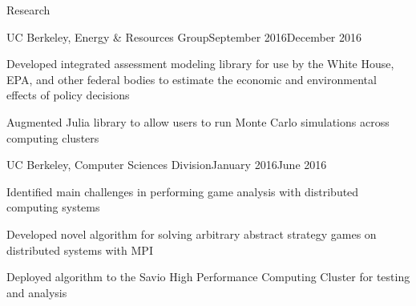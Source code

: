 \documentclass{resume} %
\begin{document}
\begin{rSection}{Research}
\begin{rSubsection}{UC Berkeley, Energy \& Resources Group}{September 2016\textminus December 2016}{}{}
\item[] Developed integrated assessment modeling library for use by the White House, EPA, and other federal bodies to estimate the economic and environmental effects of policy decisions 
\item[] Augmented Julia library to allow users to run Monte Carlo simulations across computing clusters
\end{rSubsection}
\begin{rSubsection}{UC Berkeley, Computer Sciences Division}{January 2016\textminus June 2016}{}{}
\item[] Identified main challenges in performing game analysis with distributed computing systems
\item[] Developed novel algorithm for solving arbitrary abstract strategy games on distributed systems with MPI
\item[] Deployed algorithm to the Savio High Performance Computing Cluster for testing and analysis
\end{rSubsection}
\end{rSection}






\end{document}
